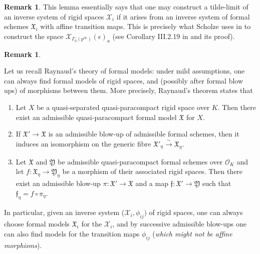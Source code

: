 \documentclass[10pt,oneside]{amsart}
\theoremstyle{definition}
\newtheorem{remark}[theorem]{Remark}
\begin{document}
	\begin{remark}
	This lemma essentially says that one may construct a tilde-limit of an inverse system of rigid spaces $\mathcal X_i$ if it arises from an inverse system of formal schemes $\mathfrak X_i$ with affine transition maps. This is precisely what Scholze uses in \cite{torsion} to construct the space $\mathcal X_{\Gamma_0(p^\infty)}(\epsilon)_a$ (see Corollary III.2.19 in \cite{torsion} and its proof).
	\end{remark}
	
	
 	\begin{remark} \label{Raynaud theory main theorem}
			
	Let us recall Raynaud's theory of formal models: under mild assumptions,
	one can always find formal models of rigid spaces, and (possibly after formal blow ups) of morphisms between them. More precisely, Raynaud's theorem \cite[section 8.4]{Bosch lectures} states that
		
		\begin{enumerate}
			\item Let $X$ be a quasi-separated quasi-paracompact rigid space over $K$. Then there exist an admissible quasi-paracompact formal model $\mathfrak X$ for $X$.
			\item If $\mathfrak X'\rightarrow \mathfrak X$ is an admissible blow-up of admissible formal schemes, then it induces an isomorphism on the generic fibre  $\mathfrak X'_\eta \xrightarrow{\sim} \mathfrak X_\eta$.
			\item Let $\mathfrak X$ and $\mathfrak Y$ be admissible quasi-paracompact formal schemes over $\mathcal O_K$ and let $f:\mathfrak X_\eta \rightarrow \mathfrak Y_\eta$ be a morphism of their associated rigid spaces. Then there exist an admissible blow-up $\pi:\mathfrak X'\rightarrow \mathfrak X$ and a map $\mathfrak f:\mathfrak X'\rightarrow \mathfrak Y$ such that $\mathfrak f_\eta = f\circ \pi_\eta$.
		\end{enumerate}
		In particular, given an inverse system ($\mathcal X_i,\phi_{ij})$ of rigid spaces, one can always choose formal models $\mathfrak X_i$ for the $\mathcal X_i$, and by successive admissible blow-ups one can also find models for the transition maps $\phi_{ij}$ (\textit{which might not be affine morphisms}). 
		\end{remark}
\end{document}
